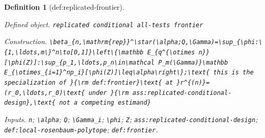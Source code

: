 \documentclass{article}
\newtheorem{definition}{Definition}
\begin{document}
\begin{definition}[def:replicated-frontier]\label{def:replicated-frontier}
\par\smallskip\noindent\emph{Defined object.} \texttt{replicated conditional all-\allowbreak{}tests frontier}
\par\smallskip\noindent\emph{Construction.} \texttt{\textbackslash{}\allowbreak{}beta\_\allowbreak{}\{n,\allowbreak{}\textbackslash{}\allowbreak{}mathrm\{rep\}\allowbreak{}\}\allowbreak{}\textasciicircum{}\textbackslash{}\allowbreak{}star(\textbackslash{}\allowbreak{}alpha;\allowbreak{}Q,\allowbreak{}\textbackslash{}\allowbreak{}Gamma)=\allowbreak{}\textbackslash{}\allowbreak{}sup\_\allowbreak{}\{\textbackslash{}\allowbreak{}phi:\allowbreak{}\textbackslash{}\allowbreak{}\{1,\allowbreak{}\textbackslash{}\allowbreak{}ldots,\allowbreak{}m\textbackslash{}\allowbreak{}\}\allowbreak{}\textasciicircum{}n\textbackslash{}\allowbreak{}to[0,\allowbreak{}1]\}\allowbreak{}\textbackslash{}\allowbreak{}left\textbackslash{}\allowbreak{}\{\textbackslash{}\allowbreak{}mathbb E\_\allowbreak{}\{q\textasciicircum{}\{\textbackslash{}\allowbreak{}otimes n\}\allowbreak{}\}\allowbreak{}[\textbackslash{}\allowbreak{}phi(Z)]:\allowbreak{}\textbackslash{}\allowbreak{}sup\_\allowbreak{}\{p\_\allowbreak{}1,\allowbreak{}\textbackslash{}\allowbreak{}ldots,\allowbreak{}p\_\allowbreak{}n\textbackslash{}\allowbreak{}in\textbackslash{}\allowbreak{}mathcal P\_\allowbreak{}m(\textbackslash{}\allowbreak{}Gamma)\}\allowbreak{}\textbackslash{}\allowbreak{}mathbb E\_\allowbreak{}\{\textbackslash{}\allowbreak{}otimes\_\allowbreak{}\{i=\allowbreak{}1\}\allowbreak{}\textasciicircum{}np\_\allowbreak{}i\}\allowbreak{}[\textbackslash{}\allowbreak{}phi(Z)]\textbackslash{}\allowbreak{}leq\textbackslash{}\allowbreak{}alpha\textbackslash{}\allowbreak{}right\textbackslash{}\allowbreak{}\}\allowbreak{};\allowbreak{}\textbackslash{}\allowbreak{}text\{ this is the specialization of \}\allowbreak{}\{\textbackslash{}\allowbreak{}rm def:\allowbreak{}frontier\}\allowbreak{}\textbackslash{}\allowbreak{}text\{ at \}\allowbreak{}r\textasciicircum{}\{(n)\}\allowbreak{}=\allowbreak{}(r\_\allowbreak{}0,\allowbreak{}\textbackslash{}\allowbreak{}ldots,\allowbreak{}r\_\allowbreak{}0)\textbackslash{}\allowbreak{}text\{ under \}\allowbreak{}\{\textbackslash{}\allowbreak{}rm ass:\allowbreak{}replicated-\allowbreak{}conditional-\allowbreak{}design\}\allowbreak{},\allowbreak{}\textbackslash{}\allowbreak{}text\{ not a competing estimand\}\allowbreak{}}
\par\smallskip\noindent\emph{Inputs.} \texttt{n}; \texttt{\textbackslash{}\allowbreak{}alpha}; \texttt{Q}; \texttt{\textbackslash{}\allowbreak{}Gamma\_\allowbreak{}i}; \texttt{\textbackslash{}\allowbreak{}phi}; \texttt{Z}; \texttt{ass:\allowbreak{}replicated-\allowbreak{}conditional-\allowbreak{}design}; \texttt{def:\allowbreak{}local-\allowbreak{}rosenbaum-\allowbreak{}polytope}; \texttt{def:\allowbreak{}frontier}.
\end{definition}
\end{document}
